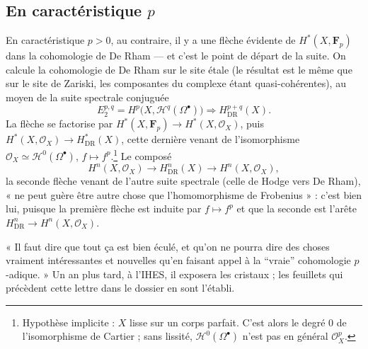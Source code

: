 \documentclass[11pt,a4paper]{article}
\begin{document}
\subsection*{En caractéristique $p$}

En caractéristique $p > 0$, au contraire, il y a une flèche évidente de
$H^{*}(X, \mathbf{F}_p)$ dans la cohomologie de De Rham — et c'est le point
de départ de la suite. On calcule la cohomologie de De Rham sur le site
étale (le résultat est le même que sur le site de Zariski, les composantes
du complexe étant quasi-cohérentes), au moyen de la suite spectrale
conjuguée
\[
E_2^{p,q} = H^{p}\bigl(X, \mathcal{H}^{q}(\Omega^{\bullet})\bigr)
\Longrightarrow H^{p+q}_{\mathrm{DR}}(X).
\]
La flèche se factorise par $H^{*}(X, \mathbf{F}_p) \to H^{*}(X,
\mathcal{O}_X)$, puis $H^{*}(X, \mathcal{O}_X) \to H^{*}_{\mathrm{DR}}(X)$,
cette dernière venant de l'isomorphisme $\mathcal{O}_X \simeq
\mathcal{H}^{0}(\Omega^{\bullet})$, $f \mapsto f^{p}$.\footnote{Hypothèse
implicite : $X$ lisse sur un corps parfait. C'est alors le degré $0$ de
l'isomorphisme de Cartier ; sans lissité, $\mathcal{H}^{0}(\Omega^{\bullet})$
n'est pas en général $\mathcal{O}_X^{p}$.} Le composé
\[
H^{n}(X, \mathcal{O}_X) \longrightarrow H^{n}_{\mathrm{DR}}(X)
\longrightarrow H^{n}(X, \mathcal{O}_X),
\]
la seconde flèche venant de l'autre suite spectrale (celle de Hodge vers De
Rham), « ne peut guère être autre chose que l'homomorphisme de
Frobenius » : c'est bien lui, puisque la première flèche est induite par
$f \mapsto f^{p}$ et que la seconde est l'arête $H^{n}_{\mathrm{DR}} \to
H^{n}(X, \mathcal{O}_X)$.

« Il faut dire que tout ça est bien éculé, et qu'on ne pourra dire des choses
vraiment intéressantes et nouvelles qu'en faisant appel à la “vraie”
cohomologie $p$-adique. » Un an plus tard, à l'IHES, il exposera les
cristaux ; les feuillets qui précèdent cette lettre dans le dossier en sont
l'établi.
\end{document}
